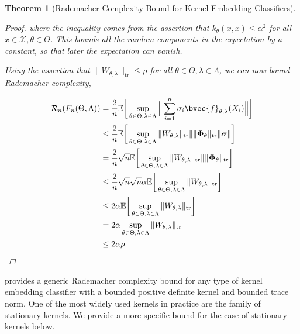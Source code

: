 \documentclass{article}
\newtheorem{theorem}{Theorem}[section]
\begin{document}
\begin{theorem}[Rademacher Complexity Bound for Kernel Embedding Classifiers]
\begin{proof}
				where the inequality comes from the assertion that $k_{\theta}(x, x) \leq \alpha^{2}$ for all $x \in \mathcal{X}, \theta \in \Theta$. This bounds all the random components in the expectation by a constant, so that later the expectation can vanish. 
				
				Using the assertion that $\| W_{\theta, \lambda} \|_{\mathrm{tr}} \leq \rho$ for all $\theta \in \Theta, \lambda \in \Lambda$, we can now bound Rademacher complexity,
				
				\begin{equation}
					\begin{aligned}
						\mathcal{R}_{n}(F_{n}(\Theta, \Lambda)) &= \frac{2}{n} \mathbb{E}\bigg[\sup_{\theta \in \Theta, \lambda \in \Lambda} \Big\| \sum_{i = 1}^{n} \sigma_{i}\bvec{f}_{\theta, \lambda}(X_{i}) \Big\|\bigg] \\
						&\leq \frac{2}{n} \mathbb{E}\bigg[\sup_{\theta \in \Theta, \lambda \in \Lambda} \|  W_{\theta, \lambda} \|_{\mathrm{tr}} \| \| \bm{\Phi}_{\theta} \|_{\mathrm{tr}} \| \bm{\sigma} \| \bigg] \\
						&= \frac{2}{n} \sqrt{n} \mathbb{E}\bigg[\sup_{\theta \in \Theta, \lambda \in \Lambda} \|  W_{\theta, \lambda} \|_{\mathrm{tr}} \| \| \bm{\Phi}_{\theta} \|_{\mathrm{tr}} \bigg] \\
						&\leq \frac{2}{n} \sqrt{n} \sqrt{n} \alpha \mathbb{E}\bigg[\sup_{\theta \in \Theta, \lambda \in \Lambda} \|  W_{\theta, \lambda} \|_{\mathrm{tr}} \bigg] \\
						&\leq 2 \alpha \mathbb{E}\bigg[\sup_{\theta \in \Theta, \lambda \in \Lambda} \|  W_{\theta, \lambda} \|_{\mathrm{tr}} \bigg] \\
						&= 2 \alpha \sup_{\theta \in \Theta, \lambda \in \Lambda} \|  W_{\theta, \lambda} \|_{\mathrm{tr}} \\
						&\leq 2 \alpha \rho.
					\end{aligned}
				\end{equation}
			\end{proof}
		\end{theorem}
	
		 provides a generic Rademacher complexity bound for any type of kernel embedding classifier with a bounded positive definite kernel and bounded trace norm. One of the most widely used kernels in practice are the family of stationary kernels. We provide a more specific bound for the case of stationary kernels below.
		
\end{document}
